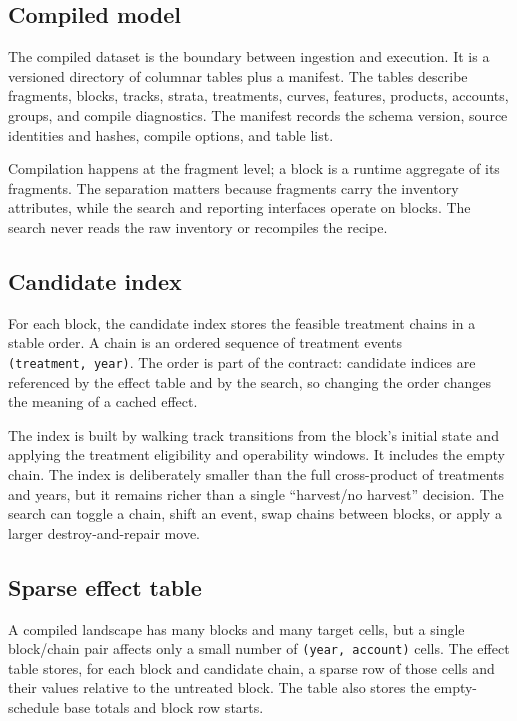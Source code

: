 \documentclass[11pt]{article}
\begin{document}
\subsection{Compiled model}\label{compiled-model}

The compiled dataset is the boundary between ingestion and execution. It is a versioned directory of columnar tables plus a manifest. The tables describe fragments, blocks, tracks, strata, treatments, curves, features, products, accounts, groups, and compile diagnostics. The manifest records the schema version, source identities and hashes, compile options, and table list.

Compilation happens at the fragment level; a block is a runtime aggregate of its fragments. The separation matters because fragments carry the inventory attributes, while the search and reporting interfaces operate on blocks. The search never reads the raw inventory or recompiles the recipe.

\subsection{Candidate index}\label{candidate-index}

For each block, the candidate index stores the feasible treatment chains in a stable order. A chain is an ordered sequence of treatment events \texttt{(treatment,\ year)}. The order is part of the contract: candidate indices are referenced by the effect table and by the search, so changing the order changes the meaning of a cached effect.

The index is built by walking track transitions from the block's initial state and applying the treatment eligibility and operability windows. It includes the empty chain. The index is deliberately smaller than the full cross-product of treatments and years, but it remains richer than a single ``harvest/no harvest'' decision. The search can toggle a chain, shift an event, swap chains between blocks, or apply a larger destroy-and-repair move.

\subsection{Sparse effect table}\label{sparse-effect-table}

A compiled landscape has many blocks and many target cells, but a single block/chain pair affects only a small number of \texttt{(year,\ account)} cells. The effect table stores, for each block and candidate chain, a sparse row of those cells and their values relative to the untreated block. The table also stores the empty-schedule base totals and block row starts.
\end{document}
